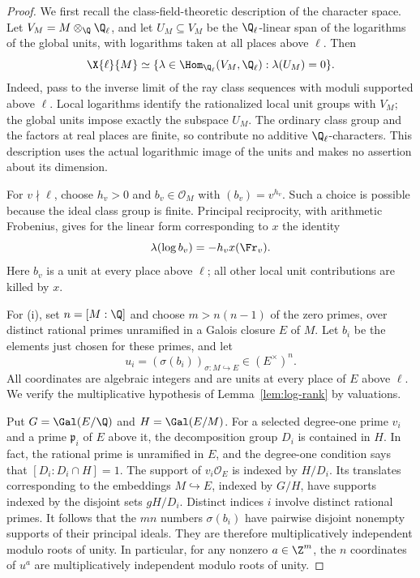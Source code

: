 \begin{proof}
We first recall the class-field-theoretic description of the character
space.  Let $V_M=M\otimes_\Q\Q_\ell$, and let $U_M\subseteq V_M$
be the $\Q_\ell$-linear span of the logarithms of the global units,
with logarithms taken at all places above $\ell$.  Then
\begin{equation}\label{eq:character-class-field}
 \X{\ell}{M}\simeq
 \{\lambda\in\Hom_{\Q_\ell}(V_M,\Q_\ell):
                         \lambda(U_M)=0\}.
\end{equation}
Indeed, pass to the inverse limit of the ray class sequences with
moduli supported above $\ell$.  Local logarithms identify the
rationalized local unit groups with $V_M$; the global units impose
exactly the subspace $U_M$.  The ordinary class group and the factors
at real places are finite, so contribute no additive
$\Q_\ell$-characters.  This description uses the actual logarithmic
image of the units and makes no assertion about its dimension.

For $v\nmid\ell$, choose $h_v>0$ and $b_v\in\mathcal O_M$ with
$(b_v)=v^{h_v}$.  Such a choice is possible because the ideal class
group is finite.  Principal reciprocity, with arithmetic Frobenius,
gives for the linear form corresponding to $x$ the identity
\begin{equation}\label{eq:character-principal-reciprocity}
 \lambda(\log b_v)=-h_vx(\Fr_v).
\end{equation}
Here $b_v$ is a unit at every place above $\ell$; all other local
unit contributions are killed by $x$.

For (i), set $n=[M:\Q]$ and choose $m>n(n-1)$ of the zero primes,
over distinct rational primes unramified in a Galois closure $E$ of
$M$.  Let $b_i$ be the elements just chosen for these primes, and
let
\[
 u_i=(\sigma(b_i))_{\sigma:M\hookrightarrow E}\in(E^\times)^n.
\]
All coordinates are algebraic integers and are units at every place
of $E$ above $\ell$.  We verify the multiplicative hypothesis of
Lemma~\ref{lem:log-rank} by valuations.

Put $G=\Gal(E/\Q)$ and $H=\Gal(E/M)$.  For a selected degree-one
prime $v_i$ and a prime $\mathfrak p_i$ of $E$ above it, the
decomposition group $D_i$ is contained in $H$.  In fact, the rational
prime is unramified in $E$, and the degree-one condition says that
$[D_i:D_i\cap H]=1$.  The support of $v_i\mathcal O_E$ is
indexed by $H/D_i$.  Its translates corresponding to the embeddings
$M\hookrightarrow E$, indexed by $G/H$, have supports indexed by
the disjoint sets $gH/D_i$.  Distinct indices $i$ involve distinct
rational primes.  It follows that the $mn$ numbers
$\sigma(b_i)$ have pairwise disjoint nonempty supports of their
principal ideals.  They are therefore multiplicatively independent
modulo roots of unity.  In particular, for any nonzero
$a\in\Z^m$, the $n$ coordinates of $u^a$ are multiplicatively
independent modulo roots of unity.


\end{proof}
